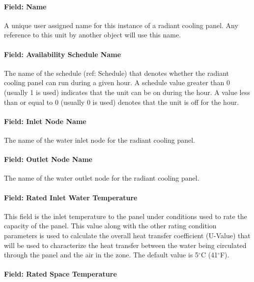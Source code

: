 \paragraph{Field: Name}\label{field-name-3-025-1}

A unique user assigned name for this instance of a radiant cooling panel. Any reference to this unit by another object will use this name.

\paragraph{Field: Availability Schedule Name}\label{field-availability-schedule-name-3-005-1}

The name of the schedule (ref: Schedule) that denotes whether the radiant cooling panel can run during a given hour. A schedule value greater than 0 (usually 1 is used) indicates that the unit can be on during the hour. A value less than or equal to 0 (usually 0 is used) denotes that the unit is off for the hour.

\paragraph{Field: Inlet Node Name}\label{field-inlet-node-name-2-002-1}

The name of the water inlet node for the radiant cooling panel.

\paragraph{Field: Outlet Node Name}\label{field-outlet-node-name-2-002-1}

The name of the water outlet node for the radiant cooling panel.

\paragraph{Field: Rated Inlet Water Temperature}

This field is the inlet temperature to the panel under conditions used to rate the capacity of the panel.  This value along with the other rating condition parameters is used to calculate the overall heat transfer coefficient (U-Value) that will be used to characterize the heat transfer between the water being circulated through the panel and the air in the zone.  The default value is 5$^\circ$C (41$^\circ$F).

\paragraph{Field: Rated Space Temperature}\label{field-rated-space-temperature}

